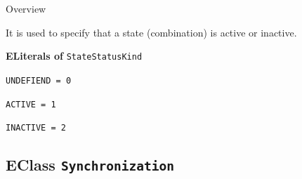 	\begin{longdescription}
		\item[Overview] 		
				

	

		It is used to specify that a state (combination) is active or inactive.		
	
		\item[\textbf{ELiterals of} \texttt{StateStatusKind}] ~
		\begin{longdescription}
			
\item[\texttt{UNDEFIEND = 0}] ~
\nopagebreak

\item[\texttt{ACTIVE = 1}] ~
\nopagebreak

\item[\texttt{INACTIVE = 2}] ~
\nopagebreak
		\end{longdescription}
	\end{longdescription}
	
	

\subsection{EClass \bfseries \texttt{Synchronization}\normalfont}
\label{cls:dependencylanguage::Synchronization} 
	
